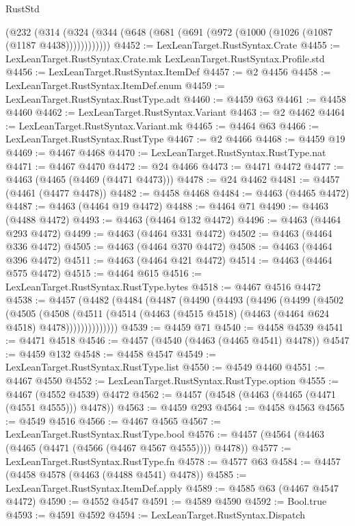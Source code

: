 \begin{lexlean}{RustStd}
\begin{coremodule}
    (@232 (@314 (@324 (@344 (@648 (@681 (@691 (@972 (@1000 (@1026 (@1087 (@1187 @4438))))))))))))
@4452 := LexLeanTarget.RustSyntax.Crate
@4455 := LexLeanTarget.RustSyntax.Crate.mk LexLeanTarget.RustSyntax.Profile.std
@4456 := LexLeanTarget.RustSyntax.ItemDef
@4457 := @2 @4456
@4458 := LexLeanTarget.RustSyntax.ItemDef.enum
@4459 := LexLeanTarget.RustSyntax.RustType.adt
@4460 := @4459 @63
@4461 := @4458 @4460
@4462 := LexLeanTarget.RustSyntax.Variant
@4463 := @2 @4462
@4464 := LexLeanTarget.RustSyntax.Variant.mk
@4465 := @4464 @63
@4466 := LexLeanTarget.RustSyntax.RustType
@4467 := @2 @4466
@4468 := @4459 @19
@4469 := @4467 @4468
@4470 := LexLeanTarget.RustSyntax.RustType.nat
@4471 := @4467 @4470
@4472 := @24 @4466
@4473 := @4471 @4472
@4477 := @4463 (@4465 (@4469 (@4471 @4473)))
@4478 := @24 @4462
@4481 := @4457 (@4461 (@4477 @4478))
@4482 := @4458 @4468
@4484 := @4463 (@4465 @4472)
@4487 := @4463 (@4464 @19 @4472)
@4488 := @4464 @71
@4490 := @4463 (@4488 @4472)
@4493 := @4463 (@4464 @132 @4472)
@4496 := @4463 (@4464 @293 @4472)
@4499 := @4463 (@4464 @331 @4472)
@4502 := @4463 (@4464 @336 @4472)
@4505 := @4463 (@4464 @370 @4472)
@4508 := @4463 (@4464 @396 @4472)
@4511 := @4463 (@4464 @421 @4472)
@4514 := @4463 (@4464 @575 @4472)
@4515 := @4464 @615
@4516 := LexLeanTarget.RustSyntax.RustType.bytes
@4518 := @4467 @4516 @4472
@4538 := @4457
    (@4482
      (@4484
        (@4487
          (@4490
            (@4493
              (@4496
                (@4499
                  (@4502
                    (@4505
                      (@4508
                        (@4511
                          (@4514 (@4463 (@4515 @4518) (@4463 (@4464 @624 @4518) @4478))))))))))))))
@4539 := @4459 @71
@4540 := @4458 @4539
@4541 := @4471 @4518
@4546 := @4457 (@4540 (@4463 (@4465 @4541) @4478))
@4547 := @4459 @132
@4548 := @4458 @4547
@4549 := LexLeanTarget.RustSyntax.RustType.list
@4550 := @4549 @4460
@4551 := @4467 @4550
@4552 := LexLeanTarget.RustSyntax.RustType.option
@4555 := @4467 (@4552 @4539) @4472
@4562 := @4457 (@4548 (@4463 (@4465 (@4471 (@4551 @4555))) @4478))
@4563 := @4459 @293
@4564 := @4458 @4563
@4565 := @4549 @4516
@4566 := @4467 @4565
@4567 := LexLeanTarget.RustSyntax.RustType.bool
@4576 := @4457 (@4564 (@4463 (@4465 (@4471 (@4566 (@4467 @4567 @4555)))) @4478))
@4577 := LexLeanTarget.RustSyntax.RustType.fn
@4578 := @4577 @63
@4584 := @4457 (@4458 @4578 (@4463 (@4488 @4541) @4478))
@4585 := LexLeanTarget.RustSyntax.ItemDef.apply
@4589 := @4585 @63 (@4467 @4547 @4472)
@4590 := @4552 @4547
@4591 := @4589 @4590
@4592 := Bool.true
@4593 := @4591 @4592
@4594 := LexLeanTarget.RustSyntax.Dispatch

\end{coremodule}
\end{lexlean}
